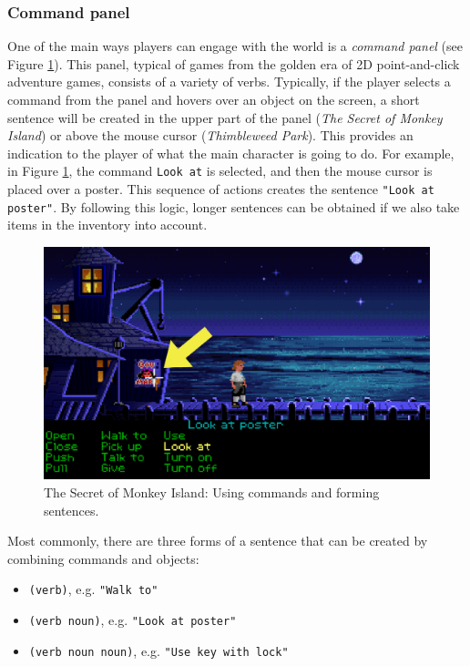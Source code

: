 \subsubsection{Command panel}
One of the main ways players can engage with the world is a \textit{command panel} (see Figure \ref{fig:C-TSoMI}). This panel, typical of games from the golden era of 2D point-and-click adventure games, consists of a variety of verbs. Typically, if the player selects a command from the panel and hovers over an object on the screen, a short sentence will be created in the upper part of the panel (\textit{The Secret of Monkey Island}) or above the mouse cursor (\textit{Thimbleweed Park}). This provides an indication to the player of what the main character is going to do. For example, in Figure \ref{fig:C-TSoMI}, the command \texttt{Look at} is selected, and then the mouse cursor is placed over a poster. This sequence of actions creates the sentence \texttt{"Look at poster"}. By following this logic, longer sentences can be obtained if we also take items in the inventory into account.

\begin{figure}[H]
\centering
\includegraphics[width=.8\linewidth]{img/C-TSoMI.png}
\caption{The Secret of Monkey Island: Using commands and forming sentences.}
\label{fig:C-TSoMI}
\end{figure}

Most commonly, there are three forms of a sentence that can be created by combining commands and objects:
\begin{itemize}
    \item \verb|(verb)|, e.g. \texttt{"Walk to"}
    \item \verb|(verb noun)|, e.g. \texttt{"Look at poster"}
    \item \verb|(verb noun noun)|, e.g. \texttt{"Use key with lock"}
\end{itemize}
 
